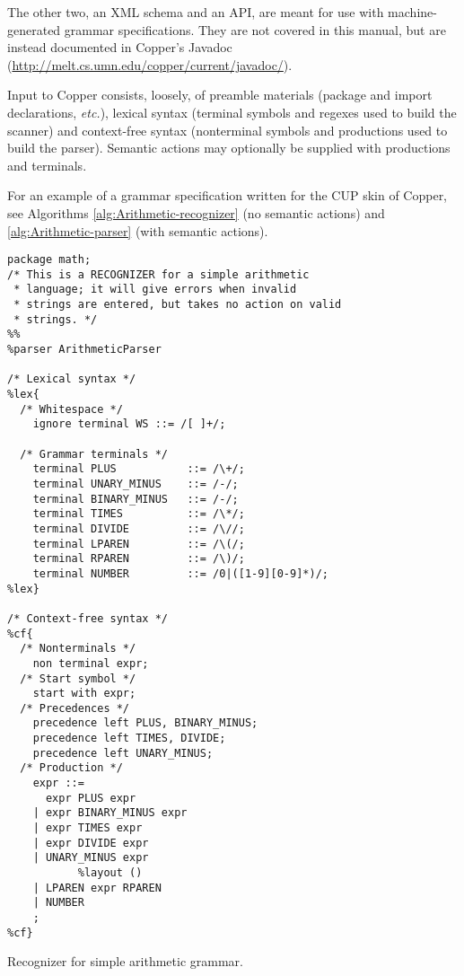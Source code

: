 \documentclass[12pt,english,twoside]{report}
\begin{document}
The other two, an XML schema and an API, are meant for use with
machine-generated grammar specifications. They are not covered in this
manual, but are instead documented in Copper's Javadoc
(\url{http://melt.cs.umn.edu/copper/current/javadoc/}).

Input to Copper consists, loosely, of preamble materials (package and
import declarations, \emph{etc.}), lexical syntax (terminal symbols
and regexes used to build the scanner) and context-free syntax
(nonterminal symbols and productions used to build the parser).
Semantic actions may optionally be supplied with productions and
terminals.

For an example of a grammar specification written for the CUP skin
of Copper, see Algorithms \ref{alg:Arithmetic-recognizer} (no semantic
actions) and \ref{alg:Arithmetic-parser} (with semantic actions).
%
\begin{algorithm}
  {\small
\begin{verbatim}
package math;
/* This is a RECOGNIZER for a simple arithmetic
 * language; it will give errors when invalid
 * strings are entered, but takes no action on valid
 * strings. */
%%
%parser ArithmeticParser

/* Lexical syntax */
%lex{
  /* Whitespace */
    ignore terminal WS ::= /[ ]+/;

  /* Grammar terminals */
    terminal PLUS           ::= /\+/;
    terminal UNARY_MINUS    ::= /-/;
    terminal BINARY_MINUS   ::= /-/;
    terminal TIMES          ::= /\*/;
    terminal DIVIDE         ::= /\//;
    terminal LPAREN         ::= /\(/;
    terminal RPAREN         ::= /\)/;
    terminal NUMBER         ::= /0|([1-9][0-9]*)/;
%lex}

/* Context-free syntax */
%cf{
  /* Nonterminals */
    non terminal expr;
  /* Start symbol */
    start with expr;
  /* Precedences */
    precedence left PLUS, BINARY_MINUS;
    precedence left TIMES, DIVIDE;
    precedence left UNARY_MINUS;
  /* Production */
    expr ::=
      expr PLUS expr
    | expr BINARY_MINUS expr
    | expr TIMES expr
    | expr DIVIDE expr
    | UNARY_MINUS expr
           %layout ()
    | LPAREN expr RPAREN
    | NUMBER
    ;
%cf}

\end{verbatim}
}
\caption{\label{alg:Arithmetic-recognizer}Recognizer for simple arithmetic
grammar.}
\end{algorithm}
\end{document}
